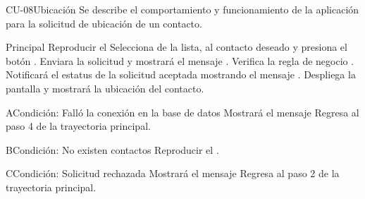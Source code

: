 \begin{UseCase}{CU-08}{Ubicación}{
	Se describe el comportamiento y funcionamiento de la aplicación para la solicitud de ubicación de un contacto.
}
	\end{UseCase}
	\begin{UCtrayectoria}{Principal}
		\UCpaso Reproducir el 
		\UCpaso[\UCactor] Selecciona de la lista, al contacto deseado y presiona el botón .  
		\UCpaso[\UCsist] Enviara la solicitud y mostrará el mensaje .
		\UCpaso[\UCsist] Verifica la regla de negocio . 
		\UCpaso[\UCsist] Notificará el estatus de la solicitud aceptada mostrando el mensaje .
		\UCpaso[\UCsist] Despliega la pantalla  y mostrará la ubicación del contacto.
	\end{UCtrayectoria}
	\begin{UCtrayectoriaA}{A}{Condición: Falló la conexión en la base de datos}
		\UCpaso[\UCsist] Mostrará el mensaje 
		\UCpaso[\UCsist] Regresa al paso 4 de la trayectoria principal. 
	\end{UCtrayectoriaA}
	\begin{UCtrayectoriaA}{B}{Condición: No existen contactos}
		\UCpaso[\UCsist] Reproducir el . 
	\end{UCtrayectoriaA}
	\begin{UCtrayectoriaA}{C}{Condición: Solicitud rechazada}
		\UCpaso[\UCsist] Mostrará el mensaje 
		\UCpaso[\UCsist] Regresa al paso 2 de la trayectoria principal. 
	\end{UCtrayectoriaA}	